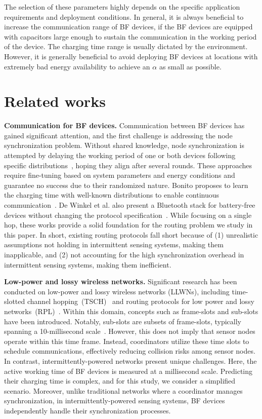 \documentclass[lettersize,journal]{IEEEtran}
\begin{document}
The selection of these parameters highly depends on the specific application requirements and deployment conditions. In general, it is always beneficial to increase the communication range of BF devices, if the BF devices are equipped with capacitors large enough to sustain the communication in the working period of the device. The charging time range is usually dictated by the environment. However, it is generally beneficial to avoid deploying BF devices at locations with extremely bad energy availability to achieve an $\alpha$ as small as possible.



\section{Related works}
\label{sec:relatedwork}
\textbf{Communication for BF devices.} 
Communication between BF devices has gained significant attention, and the first challenge is addressing the node synchronization problem. Without shared knowledge, node synchronization is attempted by delaying the working period of one or both devices following specific distributions~\cite{2018-tecs-predic,2021-mass-comm,2021-nsdi-find}, hoping they align after several rounds. These approaches require fine-tuning based on system parameters and energy conditions and guarantee no success due to their randomized nature. Bonito proposes to learn the charging time with well-known distributions to enable continuous communication~\cite{2022-nsdi-bonito}. De Winkel et al. also present a Bluetooth stack for battery-free devices without changing the protocol specification~\cite{2022-mobisys-bluetooth}. While focusing on a single hop, these works provide a solid foundation for the routing problem we study in this paper.
In short, existing routing protocols fall short because of (1) unrealistic assumptions not holding in intermittent sensing systems, making them inapplicable, and (2) not accounting for the high synchronization overhead in intermittent sensing systems, making them inefficient.

\textbf{Low-power and lossy wireless networks.} 
Significant research has been conducted on low-power and lossy wireless networks (LLWNs), including time-slotted channel hopping~(TSCH)~\cite{2019-nca-tsch-survey}  
and routing protocols for low power and lossy networks~(RPL)~\cite{2019-sensors-llns}. Within this domain, concepts such as frame-slots and sub-slots have been introduced. Notably, sub-slots are subsets of frame-slots, typically spanning a 10-millisecond scale~\cite{2021-ieee-tsch, 2011-acm-ch, 2014-ICS-iscc, 2020-infocom-ost}. However, this does not imply that sensor nodes operate within this time frame. Instead, coordinators utilize these time slots to schedule communications, effectively reducing collision risks among sensor nodes. In contrast, intermittently-powered networks present unique challenges. Here, the active working time of BF devices is measured at a millisecond scale. Predicting their charging time is complex, and for this study, we consider a simplified scenario. Moreover, unlike traditional networks where a coordinator manages synchronization, in intermittently-powered sensing systems, BF devices independently handle their synchronization processes.
\end{document}
